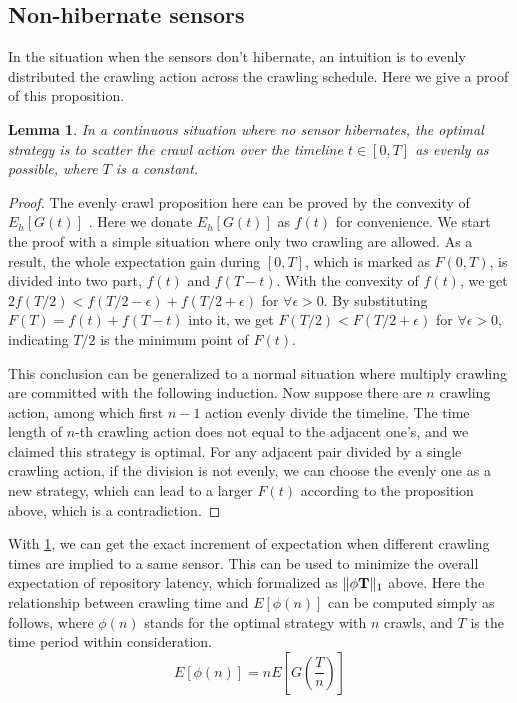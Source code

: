 \documentclass[conference]{IEEEtran}
\newtheorem{lemma}{Lemma}
\begin{document}
\subsection{Non-hibernate sensors}

In the situation when the sensors don't hibernate, an intuition is to evenly distributed the crawling action across the crawling schedule. Here we give a proof of this proposition.

\begin{lemma}
\label{evenly}
In a continuous situation where no sensor hibernates, the optimal strategy is to scatter the crawl action over the timeline $t\in [0, T]$ as evenly as possible, where $T$ is a constant.
\end{lemma}

\begin{proof}
The evenly crawl proposition here can be proved by the convexity of $E_h[G(t)]$ \cite{boyd2004convex}. Here we donate $E_h[G(t)]$ as $f(t)$ for convenience. 
We start the proof with a simple situation where only two crawling are allowed. 
As a result, the whole expectation gain during $[0,T]$, which is marked as $F(0, T)$, is divided into two part, $f(t)$ and $f(T-t)$. With the convexity of $f(t)$, we get $2f(T/2)<f(T/2-\epsilon)+f(T/2+\epsilon)$ for $\forall{\epsilon>0}$. By substituting $F(T)=f(t)+f(T-t)$ into it, we get $F(T/2)<F(T/2+\epsilon)$ for $\forall{\epsilon>0}$, indicating $T/2$ is the minimum point of $F(t)$.


This conclusion can be generalized to a normal situation where multiply crawling are committed with the following induction. 
Now suppose there are $n$ crawling action, among which first $n-1$ action evenly divide the timeline. The time length of $n$-th crawling action does not equal to the adjacent one's, and we claimed this strategy is optimal. For any adjacent pair divided by a single crawling action, if the division is not evenly, we can choose the evenly one as a new strategy, which can lead to a larger $F(t)$ according to the proposition above, which is a contradiction.
\end{proof}


With \ref{evenly}, we can get the exact increment of expectation when different crawling times are implied to a same sensor. This can be used to minimize the overall expectation of repository latency, which formalized as $\Arrowvert \phi\mathbf{T} \Arrowvert_{1}$ above.
Here the relationship between crawling time and $E[\phi(n)]$ can be computed simply as follows, where $\phi(n)$ stands for the optimal strategy with $n$ crawls, and $T$ is the time period within consideration. 
\begin{equation}
E[\phi(n)]=nE[G(\frac{T}{n})]\label{NonHib}
\end{equation}
\end{document}
